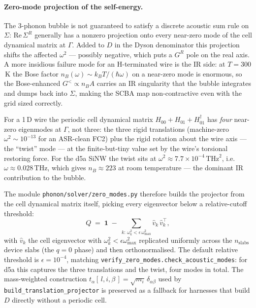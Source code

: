 \paragraph{Zero-mode projection of the self-energy.}
The 3-phonon bubble is not guaranteed to satisfy a discrete acoustic
sum rule on $\Sigma$: $\mathrm{Re}\,\Sigma^{R}$ generally has a
nonzero projection onto every near-zero mode of the cell dynamical
matrix at $\Gamma$. Added to $D$ in the Dyson denominator this
projection shifts the affected $\omega^{2}$ --- possibly negative,
which puts a $G^{R}$ pole on the real axis. A more insidious failure
mode for an H-terminated wire is the IR side: at $T=300$\,K the Bose
factor $n_{B}(\omega)\sim k_{B}T/(\hbar\omega)$ on a near-zero mode is
enormous, so the Bose-enhanced $G^{<}\propto n_{B}A$ carries an IR
singularity that the bubble integrates and dumps back into $\Sigma$,
making the SCBA map non-contractive even with the grid sized
correctly.

For a 1\,D wire the periodic cell dynamical matrix
$H_{00}+H_{01}+H_{01}^{\dagger}$ has \emph{four} near-zero eigenmodes
at $\Gamma$, not three: the three rigid translations (machine-zero
$\omega^{2}\sim 10^{-13}$ for an ASR-clean FC2) plus the rigid
rotation about the wire axis --- the ``twist'' mode --- at the
finite-but-tiny value set by the wire's torsional restoring force.
For the d5a SiNW the twist sits at
$\omega^{2}\approx 7.7\times10^{-4}\,\mathrm{THz}^{2}$, i.e.\
$\omega\approx 0.028$\,THz, which gives $n_{B}\approx 223$ at room
temperature --- the dominant IR contribution to the bubble.

The module \texttt{phonon/solver/zero\_modes.py} therefore builds the
projector from the cell dynamical matrix itself, picking every
eigenvector below a relative-cutoff threshold:
\begin{equation}
  Q \;=\; \mathbf{1} \;-\; \sum_{k:\,\omega_{k}^{2}<\epsilon\,\omega_{\max}^{2}}
  \hat{v}_{k}\,\hat{v}_{k}^{\top},
\end{equation}
with $\hat{v}_{k}$ the cell eigenvector with $\omega_{k}^{2}<\epsilon
\omega_{\max}^{2}$ replicated uniformly across the $n_\mathrm{slabs}$
device slabs (the $q=0$ phase) and then orthonormalised. The default
relative threshold is $\epsilon=10^{-4}$, matching
\texttt{verify\_zero\_modes.check\_acoustic\_modes}: for d5a this
captures the three translations and the twist, four modes in total.
The mass-weighted construction $t_{\alpha}[\,l,i,\beta\,]=\sqrt{m_{i}}\,
\delta_{\alpha\beta}$ used by \texttt{build\_translation\_projector}
is preserved as a fallback for harnesses that build $D$ directly
without a periodic cell.

